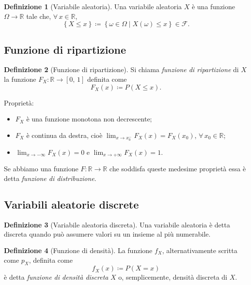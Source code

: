 \documentclass{article}
\theoremstyle{definition}
\newtheorem{definizione}{Definizione}
\newcommand{\R}{\mathbb{R}}
\begin{document}
        \begin{definizione}[Variabile aleatoria]
            Una variabile aleatoria \(X\) è una funzione \(\Omega \to \R\) tale che, \(\forall \, x \in \R\),
            \[
                \left\{X \leqslant x\right\} \coloneqq \left\{\omega \in \Omega \; | \; X (\omega) \leqslant x\right\} \in \mathscr{F}.
            \]
        \end{definizione}

        \subsection{Funzione di ripartizione}

            \begin{definizione}[Funzione di ripartizione]
                Si chiama \emph{funzione di ripartizione} di \(X\) la funzione \(F_X : \R \to [0, \, 1]\) definita come
                \[
                    F_X (x) \coloneqq P(X \leqslant x).
                \]
            \end{definizione}

            Proprietà:
            \begin{itemize}
                \item \(F_X\) è una funzione monotona non decrescente;
                \item \(F_X\) è continua da destra, cioè \(\lim_{x \to x_0^-} F_X (x) = F_X (x_0)\), \(\forall \, x_0 \in \R\);
                \item \(\lim_{x \to -\infty} F_X (x) = 0\) e \(\lim_{x \to +\infty} F_X (x) = 1\).
            \end{itemize}

            Se abbiamo una funzione \(F : \R \to \R\) che soddisfa queste medesime proprietà essa è detta \emph{funzione di distribuzione}.
        
        \subsection{Variabili aleatorie discrete}

            \begin{definizione}[Variabile aleatoria discreta]
                Una variabile aleatoria è detta discreta quando può assumere valori su un insieme al più numerabile.
            \end{definizione}

            \begin{definizione}[Funzione di densità]
                La funzione \(f_X\), alternativamente scritta come \(p_X\), definita come
                \[
                    f_X (x) \coloneqq P(X = x)
                \]
                è detta \emph{funzione di densità discreta} \(X\) o, semplicemente, densità discreta di \(X\).
            \end{definizione}
\end{document}
